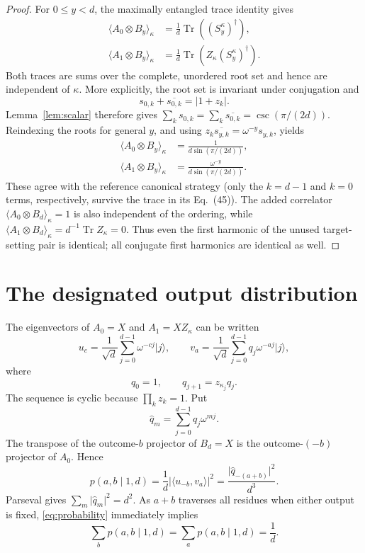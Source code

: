 \documentclass[11pt]{article}
\theoremstyle{remark}
\newcommand{\Tr}{\operatorname{Tr}}
\begin{document}
\begin{proof}
For \(0\leq y<d\), the maximally entangled trace identity gives
\[
\begin{aligned}
 \langle A_0\otimes B_y\rangle_\kappa
 &=\frac1d\Tr\!\left((S_y^\kappa)^\dagger\right),\\
 \langle A_1\otimes B_y\rangle_\kappa
 &=\frac1d\Tr\!\left(
 Z_\kappa(S_y^\kappa)^\dagger\right).
\end{aligned}
\]
Both traces are sums over the complete, unordered root set and hence are
independent of \(\kappa\).  More explicitly, the root set is invariant under
conjugation and
\[
  s_{0,k}+\overline{s_{0,k}}=\lvert1+z_k\rvert.
\]
Lemma~\ref{lem:scalar} therefore gives
\(\sum_k s_{0,k}=\sum_k\overline{s_{0,k}}
=\csc(\pi/(2d))\).  Reindexing the roots for general \(y\), and using
\(z_k\overline{s_{y,k}}=\omega^{-y}s_{y,k}\), yields
\begin{equation}
\begin{aligned}
 \langle A_0\otimes B_y\rangle_\kappa
 &=\frac1{d\sin(\pi/(2d))},\\
 \langle A_1\otimes B_y\rangle_\kappa
 &=\frac{\omega^{-y}}{d\sin(\pi/(2d))}.
\end{aligned}
\label{eq:visible-correlators}
\end{equation}
These agree with the reference canonical strategy (only the \(k=d-1\) and
\(k=0\) terms, respectively, survive the trace in its Eq.~(45)).  The added
correlator
\(\langle A_0\otimes B_d\rangle_\kappa=1\) is also independent of the
ordering, while
\(\langle A_1\otimes B_d\rangle_\kappa=d^{-1}\Tr Z_\kappa=0\).
Thus even the first harmonic of the unused target-setting pair is identical;
all conjugate first harmonics are identical as well.
\end{proof}

\section{The designated output distribution}

The eigenvectors of \(A_0=X\) and \(A_1=XZ_\kappa\) can be written
\[
  u_c=\frac1{\sqrt d}\sum_{j=0}^{d-1}\omega^{-cj}\lvert j\rangle,
  \qquad
  v_a=\frac1{\sqrt d}\sum_{j=0}^{d-1}q_j\omega^{-aj}\lvert j\rangle,
\]
where
\begin{equation}
  q_0=1,\qquad q_{j+1}=z_{\kappa_j}q_j.
  \label{eq:q}
\end{equation}
The sequence is cyclic because \(\prod_kz_k=1\).  Put
\[
  \widehat q_m=\sum_{j=0}^{d-1}q_j\omega^{mj}.
\]
The transpose of the outcome-\(b\) projector of \(B_d=X\) is the
outcome-\((-b)\) projector of \(A_0\).  Hence
\begin{equation}
  p(a,b\mid1,d)
  =\frac1d\lvert\langle u_{-b},v_a\rangle\rvert^2
  =\frac{\lvert\widehat q_{-(a+b)}\rvert^2}{d^3}.
  \label{eq:probability}
\end{equation}
Parseval gives
\(\sum_m\lvert\widehat q_m\rvert^2=d^2\).  As \(a+b\) traverses all
residues when either output is fixed, \eqref{eq:probability} immediately
implies
\begin{equation}
  \sum_bp(a,b\mid1,d)=\sum_ap(a,b\mid1,d)=\frac1d.
  \label{eq:marginals}
\end{equation}
\end{document}
